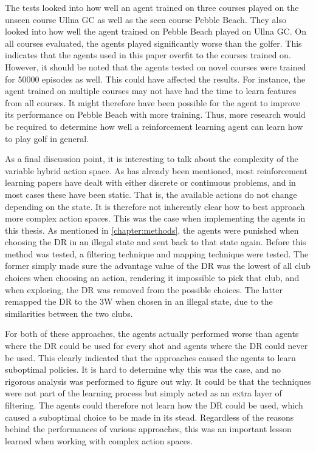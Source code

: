 \documentclass{kththesis}
\begin{document}
The tests looked into how well an agent trained on three courses played on the unseen course Ullna GC as well as the seen course Pebble Beach. They also looked into how well the agent trained on Pebble Beach played on Ullna GC. On all courses evaluated, the agents played significantly worse than the golfer. This indicates that the agents used in this paper overfit to the courses trained on. However, it should be noted that the agents tested on novel courses were trained for 50000 episodes as well. This could have affected the results. For instance, the agent trained on multiple courses may not have had the time to learn features from all courses. It might therefore have been possible for the agent to improve its performance on Pebble Beach with more training. Thus, more research would be required to determine how well a reinforcement learning agent can learn how to play golf in general.

As a final discussion point, it is interesting to talk about the complexity of the variable hybrid action space. As has already been mentioned, most reinforcement learning papers have dealt with either discrete or continuous problems, and in most cases these have been static. That is, the available actions do not change depending on the state. It is therefore not inherently clear how to best approach more complex action spaces. This was the case when implementing the agents in this thesis. As mentioned in \autoref{chapter:methods}, the agents were punished when choosing the DR in an illegal state and sent back to that state again. Before this method was tested, a filtering technique and mapping technique were tested. The former simply made sure the advantage value of the DR was the lowest of all club choices when choosing an action, rendering it impossible to pick that club, and when exploring, the DR was removed from the possible choices. The latter remapped the DR to the 3W when chosen in an illegal state, due to the similarities between the two clubs. 

For both of these approaches, the agents actually performed worse than agents where the DR could be used for every shot and agents where the DR could never be used. This clearly indicated that the approaches caused the agents to learn suboptimal policies. It is hard to determine why this was the case, and no rigorous analysis was performed to figure out why. It could be that the techniques were not part of the learning process but simply acted as an extra layer of filtering. The agents could therefore not learn how the DR could be used, which caused a suboptimal choice to be made in its stead. Regardless of the reasons behind the performances of various approaches, this was an important lesson learned when working with complex action spaces.
\end{document}
